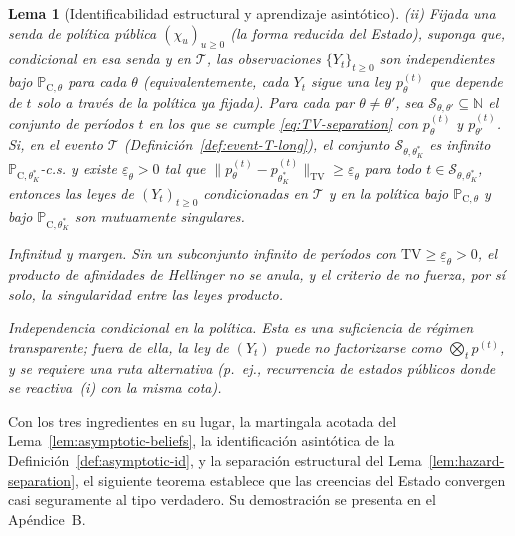 \documentclass[review,authoryear,12pt]{elsarticle}
\theoremstyle{plain}
\newtheorem{lemma}[theorem]{Lema}
\theoremstyle{definition}
\newcommand{\ProbC}[1]{\mathbb{P}_{\mathrm{C},#1}}
\newcommand{\1}{\mathbf{1}}
\begin{document}
\begin{lemma}[Identificabilidad estructural y aprendizaje asintótico]
\medskip
\noindent\textup{(ii)}
Fijada una senda de política pública $(\chi_u)_{u\ge 0}$ \textup{(}la forma reducida del Estado\textup{)}, suponga que, condicional en esa senda y en $\mathcal{T}$, las observaciones $\{Y_t\}_{t\ge 0}$ son independientes bajo $\ProbC{\theta}$ para cada $\theta$ \textup{(}equivalentemente, cada $Y_t$ sigue una ley $p_\theta^{(t)}$ que depende de $t$ solo a través de la política ya fijada\textup{)}. Para cada par $\theta\neq\theta'$, sea $\mathcal{S}_{\theta,\theta'}\subseteq\mathbb{N}$ el conjunto de períodos $t$ en los que se cumple \eqref{eq:TV-separation} con $p_\theta^{(t)}$ y $p_{\theta'}^{(t)}$. Si, en el evento $\mathcal{T}$ \textup{(}Definición~\ref{def:event-T-long}\textup{)}, el conjunto $\mathcal{S}_{\theta,\theta_K^\ast}$ es infinito $\ProbC{\theta_K^\ast}$-c.s. y existe $\underline{\varepsilon}_{\theta}>0$ tal que $\|p_\theta^{(t)}-p_{\theta_K^\ast}^{(t)}\|_{\mathrm{TV}}\ge \underline{\varepsilon}_{\theta}$ para todo $t\in\mathcal{S}_{\theta,\theta_K^\ast}$, entonces las leyes de $(Y_t)_{t\ge 0}$ condicionadas en $\mathcal{T}$ y en la política bajo $\ProbC{\theta}$ y bajo $\ProbC{\theta_K^\ast}$ son mutuamente singulares.

\medskip
\begin{list}{}{%
  \setlength{\leftmargin}{2.25em}%
  \setlength{\labelwidth}{2.25em}%
  \setlength{\labelsep}{0.45em}%
  \setlength{\itemsep}{0.35em}%
  \setlength{\parsep}{0pt}%
  \setlength{\topsep}{0.25em}%
}
\item[\textup{(C3)}] \textup{Infinitud y margen.}\quad
Sin un subconjunto infinito de períodos con $\mathrm{TV}\ge\underline{\varepsilon}_\theta>0$, el producto de afinidades de Hellinger no se anula, y el criterio de \citet{Kakutani1948} no fuerza, por sí solo, la singularidad entre las leyes producto.
\item[\textup{(C4)}] \textup{Independencia condicional en la política.}\quad
Esta es una suficiencia de régimen transparente; fuera de ella, la ley de $(Y_t)$ puede no factorizarse como $\bigotimes_t p^{(t)}$, y se requiere una ruta alternativa \textup{(}p.\ ej., recurrencia de estados públicos donde se reactiva~\textup{(i)} con la misma cota\textup{)}.
\end{list}
\end{lemma}

Con los tres ingredientes en su lugar, la martingala acotada del Lema~\ref{lem:asymptotic-beliefs}, la identificación asintótica de la Definición~\ref{def:asymptotic-id}, y la separación estructural del Lema~\ref{lem:hazard-separation}, el siguiente teorema establece que las creencias del Estado convergen casi seguramente al tipo verdadero. Su demostración se presenta en el Apéndice~B.
\end{document}
